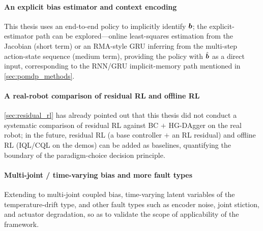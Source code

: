 \paragraph{An explicit bias estimator and context encoding} This thesis uses an end-to-end policy to implicitly identify $\bm{b}$; the explicit-estimator path can be explored---online least-squares estimation from the Jacobian (short term) or an RMA-style GRU inferring from the multi-step action-state sequence (medium term), providing the policy with $\hat{\bm{b}}$ as a direct input, corresponding to the RNN/GRU implicit-memory path mentioned in \cref{sec:pomdp_methods}.

\paragraph{A real-robot comparison of residual RL and offline RL} \cref{sec:residual_rl} has already pointed out that this thesis did not conduct a systematic comparison of residual RL against BC $+$ HG-DAgger on the real robot; in the future, residual RL (a base controller $+$ an RL residual) and offline RL (IQL/CQL on the demos) can be added as baselines, quantifying the boundary of the paradigm-choice decision principle.

\paragraph{Multi-joint / time-varying bias and more fault types} Extending to multi-joint coupled bias, time-varying latent variables of the temperature-drift type, and other fault types such as encoder noise, joint stiction, and actuator degradation, so as to validate the scope of applicability of the framework.
